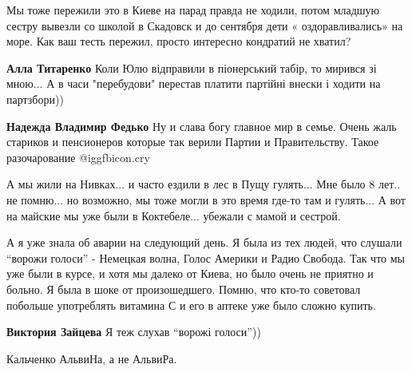 \begin{itemize}
\begin{itemize}
\end{itemize} %


Мы тоже пережили это в Киеве на парад правда не ходили, потом младшую сестру
вывезли со школой в Скадовск и до сентября дети « оздоравливались» на море. Как
ваш тесть пережил, просто интересно кондратий не хватил?

\begin{itemize} %
\textbf{Алла Титаренко} Коли Юлю відправили в піонерський табір, то мирився зі мною... А в часи "перебудови" перестав платити партійні внески і ходити на партзбори))

\textbf{Надежда Владимир Федько} Ну и слава богу главное мир в семье. Очень жаль стариков и пенсионеров которые так верили Партии и Правительству. Такое разочарование  @igg{fbicon.cry} 
\end{itemize} %


А мы жили на Нивках... и часто ездили в лес в Пущу гулять... Мне было 8 лет.. не
помню... но возможно, мы тоже могли в это время где-то там и гулять... А вот на
майские мы уже были в Коктебеле... убежали с мамой и сестрой.



А я уже знала об аварии на следующий день. Я была из тех людей, что слушали
\enquote{ворожи голоси} - Немецкая волна, Голос Америки и Радио Свобода. Так что мы уже
были в курсе, и хотя мы далеко от Киева, но было очень не приятно и больно. Я
была в шоке от произошедшего. Помню, что кто-то советовал побольше употреблять
витамина С и его в аптеке уже было сложно купить.

\textbf{Виктория Зайцева} Я теж слухав \enquote{ворожі голоси}))

Кальченко АльвиНа, а не АльвиРа.

\end{itemize} %
